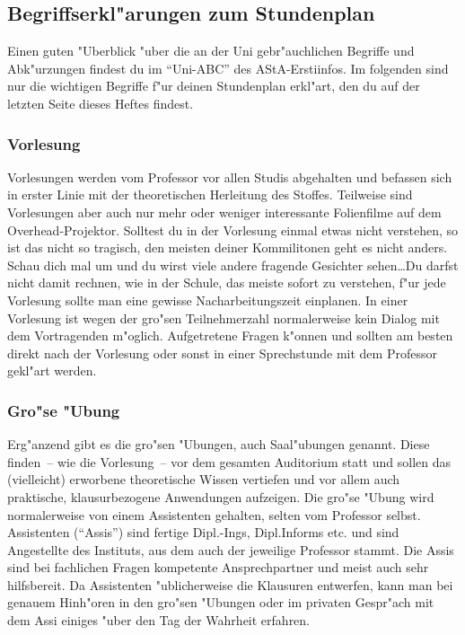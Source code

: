\subsection{Begriffserkl"arungen zum Stundenplan}


Einen guten "Uberblick "uber die an der Uni gebr"auchlichen Begriffe und
Abk"urzungen findest du im "`Uni-ABC"' des AStA-Erstiinfos. Im folgenden
sind nur die wichtigen Begriffe f"ur deinen Stundenplan erkl"art, den du
auf der letzten Seite dieses Heftes findest.


\subsubsection*{Vorlesung}

Vorlesungen werden vom Professor vor allen Studis abgehalten und befassen
sich in erster Linie mit der theoretischen Herleitung des Stoffes. Teilweise
sind Vorlesungen aber auch nur mehr oder weniger interessante Folienfilme auf
dem Overhead-Projektor. Solltest du in der Vorlesung einmal etwas nicht
verstehen, so ist das nicht so tragisch, den meisten deiner Kommilitonen geht
es nicht anders. Schau dich mal um und du wirst viele andere fragende Gesichter
sehen\ldots Du darfst nicht damit rechnen, wie in der Schule, das meiste sofort zu
verstehen, f"ur jede Vorlesung sollte man eine gewisse Nacharbeitungszeit
einplanen. In einer Vorlesung ist wegen der gro"sen Teilnehmerzahl
normalerweise kein Dialog mit dem Vortragenden m"oglich. Aufgetretene Fragen
k"onnen und sollten am besten direkt nach der Vorlesung oder sonst in einer
Sprechstunde mit dem Professor gekl"art werden.


\subsubsection*{Gro"se "Ubung}

Erg"anzend gibt es die gro"sen "Ubungen, auch Saal"ubungen genannt. Diese
finden~-- wie die Vorlesung~-- vor dem gesamten Auditorium statt und sollen das
(vielleicht) erworbene theoretische Wissen vertiefen und vor allem auch
praktische, klausurbezogene Anwendungen aufzeigen. Die gro"se "Ubung wird
normalerweise von einem Assistenten gehalten, selten vom Professor selbst.
Assistenten ("`Assis"') sind fertige Dipl.-Ings, Dipl.Informs etc. und sind
Angestellte des Instituts, aus dem auch der jeweilige Professor stammt. Die
Assis sind bei fachlichen Fragen kompetente Ansprechpartner und meist auch sehr
hilfsbereit. Da Assistenten "ublicherweise die Klausuren entwerfen, kann man
bei genauem Hinh"oren in den gro"sen "Ubungen oder im privaten Gespr"ach mit
dem Assi einiges "uber den Tag der Wahrheit erfahren.


